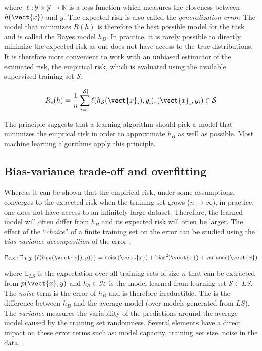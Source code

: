 where $\ell: \mathcal{Y}\times\mathcal{Y} \rightarrow \mathbb{R}$ is a loss function which measures the closeness between $h(\vect{x})$ and $y$. The expected risk is also called the \textit{generalization error}. The model that minimizes $R(h)$ is therefore the best possible model for the task and is called the Bayes model $h_B$. In practice, it is rarely possible to directly minimize the expected risk as one does not have access to the true distributions. It is therefore more convenient to work with an unbiased estimator of the estimated risk, the empirical risk, which is evaluated using the available supervised training set $\mathcal{S}$:

\begin{equation}
\label{eqn:backml:empiricalrisk}
R_e(h) = \frac{1}{n} \sum_{i=1}^{|\mathcal{S}|} \ell(h_\mathcal{S}(\vect{x}_i), y_i), (\vect{x}_i, y_i) \in \mathcal{S}
\end{equation}

The  principle suggests that a learning algorithm should pick a model that minimizes the emprical risk in order to approximate $h_B$ as well as possible. Most machine learning algorithms apply this principle.

\subsection{Bias-variance trade-off and overfitting}
\label{ssec:backml:bvtradeoff}

Whereas it can be shown that the empirical risk, under some assumptions, converges to the expected risk when the training set grows ($n \rightarrow \infty$), in practice, one does not have access to an infinitely-large dataset. Therefore, the learned model will often differ from $h_B$ and its expected risk will often be larger. The effect of the ``\textit{choice}'' of a finite training set on the error can be studied using the \textit{bias-variance decomposition} of the error \parencite{geman1992neural, geurts2009bias, friedman2017elements}:

\begin{equation}
\label{eqn:backml:biasvariancedec}
\mathbb{E}_{LS}\left\{\mathbb{E}_{\mathcal{X},\mathcal{Y}}\left\{ \ell(h_{LS}(\vect{x}), y)\right\}\right\} = \text{noise}(\vect{x}) + \text{bias}^2(\vect{x}) + \text{variance}(\vect{x})
\end{equation}

where $\mathbb{E}_{LS}$ is the expectation over all training sets of size $n$ that can be extracted from $p(\vect{x},y)$ and $h_{\mathcal{S}} \in \mathcal{H}$ is the model learned from learning set $\mathcal{S} \in LS$. The \textit{noise} term is the error of $h_B$ and is therefore irreductible. The  is the difference between $h_B$ and the average model (over models generated from $LS$). The \textit{variance} measures the variability of the predictions around the average model caused by the training set randomness. Several elements have a direct impact on these error terms such as: model capacity, training set size, noise in the data, \etc. 

